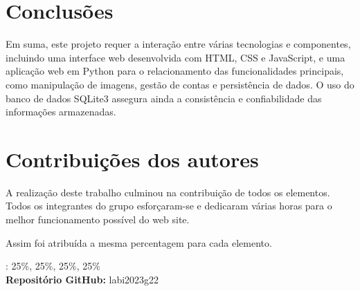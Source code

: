 \documentclass{report}
\begin{document}
\chapter{Conclusões}
\label{chap.conclusao}
Em suma, este projeto requer a interação entre várias tecnologias e componentes, incluindo uma interface web desenvolvida com HTML, CSS e JavaScript, e uma aplicação web em Python para o relacionamento das funcionalidades principais, como manipulação de imagens, gestão de contas e persistência de dados. O uso do banco de dados SQLite3 assegura ainda a consistência e confiabilidade das informações armazenadas.

\chapter*{Contribuições dos autores}

A realização deste trabalho culminou na contribuição de todos os elementos. Todos os integrantes do grupo esforçaram-se e dedicaram várias horas para o melhor funcionamento possível do web site.

Assim foi atribuída a mesma percentagem para cada elemento.
\vspace{10pt}

\autores : 25\%, 25\%, 25\%, 25\%\\

\textbf{Repositório GitHub:} labi2023g22


\printbibliography
\end{document}
